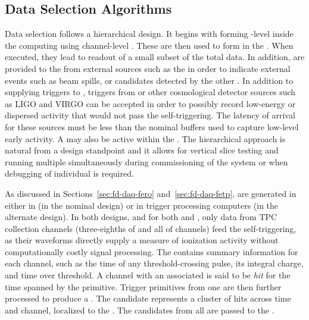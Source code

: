 

\subsection{Data Selection Algorithms}
\label{sec:fd-daq-sel}


Data selection follows a hierarchical design. 
It begins with forming -level 
inside the   computing using channel-level
. 
These are then used to form  
in the .
When executed, they lead to readout of a small subset of the total
data. 
In addition,  are provided to the
 from external sources such as the  in order to
indicate external events such as beam spills, or  candidates
detected by the other . 
In addition to supplying triggers to , triggers from
 or other cosmological detector sources such as LIGO and
VIRGO can be accepted in order to possibly record low-energy or
dispersed activity that would not pass the self-triggering. 
The latency of arrival for these sources must be less than the nominal
\snbpretime buffers used to capture low-level early 
activity.
A  may also be active within the . 
The hierarchical approach is natural from a design standpoint and 
it allows for vertical slice testing and running multiple
 simultaneously during commissioning of the system or
when debugging of individual  is required.

As discussed in Sections~\ref{sec:fd-daq-fero}
and~\ref{sec:fd-daq-fetp},  are generated in
either in  (in the nominal design) or in trigger
processing computers (in the alternate design). 
In both designs, and for both  and 
, only data from TPC collection channels (three-eighths of \single and all of \dual channels) feed
the self-triggering, as their waveforms directly supply a measure of
ionization activity without computationally costly signal processing.
The  contains summary information for each 
channel, such as the time of any threshold-crossing pulse, its
integral charge, and time over threshold. 
A channel with an associated  is said to be
\textit{hit} for the time spanned by the primitive. 
Trigger primitives from one  are then further processed
to produce a . 
The candidate represents a cluster of hits across time and
channel, localized to the .
The candidates from all  are passed to the
.


